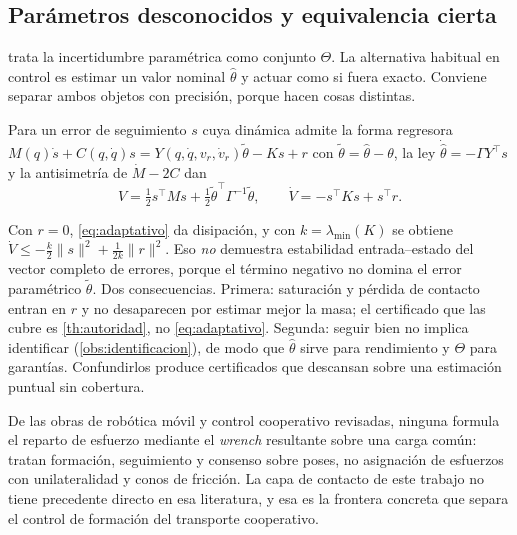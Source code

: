\subsection{Parámetros desconocidos y equivalencia cierta}

 trata la incertidumbre paramétrica como conjunto
$\Theta$. La alternativa habitual en control es estimar un valor nominal
$\hat\theta$ y actuar como si fuera exacto. Conviene separar ambos objetos con
precisión, porque hacen cosas distintas.

Para un error de seguimiento $s$ cuya dinámica admite la forma regresora
$M(q)\dot s+C(q,\dot q)s=Y(q,\dot q,v_r,\dot v_r)\tilde\theta-Ks+r$
con $\tilde\theta=\hat\theta-\theta$, la ley $\dot{\hat\theta}=-\Gamma Y^{\!\top}s$
y la antisimetría de $\dot M-2C$ dan
\begin{equation}
  V=\tfrac12 s^{\!\top}Ms+\tfrac12\tilde\theta^{\!\top}\Gamma^{-1}\tilde\theta,
  \qquad
  \dot V=-s^{\!\top}Ks+s^{\!\top}r .
  \label{eq:adaptativo}
\end{equation}

\begin{observacion}
\label{obs:adaptacion}
Con $r=0$, \eqref{eq:adaptativo} da disipación, y con
$k=\lambda_{\min}(K)$ se obtiene
$\dot V\le-\tfrac{k}{2}\|s\|^2+\tfrac{1}{2k}\|r\|^2$. Eso \emph{no} demuestra
estabilidad entrada--estado del vector completo de errores, porque el término
negativo no domina el error paramétrico $\tilde\theta$. Dos consecuencias.
Primera: saturación y pérdida de contacto entran en $r$ y no desaparecen por
estimar mejor la masa; el certificado que las cubre es
\cref{th:autoridad}, no \eqref{eq:adaptativo}. Segunda: seguir bien no implica
identificar (\cref{obs:identificacion}), de modo que $\hat\theta$ sirve para
rendimiento y $\Theta$ para garantías. Confundirlos produce certificados que
descansan sobre una estimación puntual sin cobertura.
\end{observacion}

\begin{observacion}
\label{obs:biblioteca-fisica}
De las obras de robótica móvil y control cooperativo revisadas, ninguna formula
el reparto de esfuerzo mediante el \emph{wrench} resultante sobre una carga
común: tratan formación, seguimiento y consenso sobre poses, no asignación de
esfuerzos con unilateralidad y conos de fricción. La capa de contacto de este
trabajo no tiene precedente directo en esa literatura, y esa es la frontera
concreta que separa el control de formación del transporte cooperativo.
\end{observacion}

